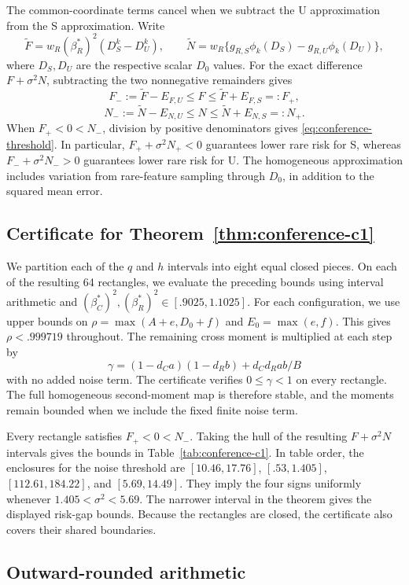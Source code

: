 The common-coordinate terms cancel when we subtract the U approximation from
the S approximation. Write
\[
 \widetilde F = w_R(\beta_R^*)^2(D_S^k - D_U^k),\qquad \widetilde N
              = w_R\{g_{R,S}\phi_k(D_S) - g_{R,U}\phi_k(D_U)\},
\]
where $D_S,D_U$ are the respective scalar $D_0$ values. For the exact difference
$F + \sigma^2N$, subtracting the two nonnegative remainders gives
\[
 F_- := \widetilde F - E_{F,U} \leq F \leq \widetilde F + E_{F,S} = :F_+,
\]
\[
 N_- := \widetilde N - E_{N,U} \leq N \leq \widetilde N + E_{N,S} = :N_+.
\]
When $F_+ < 0 < N_-$, division by positive denominators gives
\eqref{eq:conference-threshold}. In particular, $F_+ + \sigma^2N_+ < 0$
guarantees lower rare risk for S, whereas $F_- + \sigma^2N_- > 0$ guarantees
lower rare risk for U. The homogeneous approximation includes variation from rare-feature sampling
through $D_0$, in addition to the squared mean error.

\subsection{Certificate for Theorem~\ref{thm:conference-c1}}

We partition each of the $q$ and $h$ intervals into eight equal closed pieces.
On each of the resulting 64 rectangles, we evaluate the preceding bounds using
interval arithmetic and $(\beta_C^*)^2,(\beta_R^*)^2 \in[.9025,1.1025]$. For
each configuration, we use upper bounds on $\rho = \max(A + e,D_0 + f)$ and
$E_0 = \max(e,f)$. This gives $\rho < .999719$ throughout. The remaining cross
moment is multiplied at each step by
\[
 \gamma = (1 - d_Ca)(1 - d_Rb) + d_Cd_Rab/B
\]
with no added noise term. The certificate verifies $0 \leq \gamma < 1$ on
every rectangle. The full homogeneous second-moment map is therefore stable,
and the moments remain bounded when we include the fixed finite noise term.

Every rectangle satisfies $F_+ < 0 < N_-$. Taking the hull of the resulting
$F + \sigma^2N$ intervals gives the bounds in Table~\ref{tab:conference-c1}.
In table order, the enclosures for the noise threshold are $[10.46,17.76]$,
$[.53,1.405]$, $[112.61,184.22]$, and $[5.69,14.49]$. They imply the four signs
uniformly whenever $1.405 < \sigma^2 < 5.69$. The narrower interval in the
theorem gives the displayed risk-gap bounds. Because the rectangles are closed,
the certificate also covers their shared boundaries.

\subsection{Outward-rounded arithmetic}

